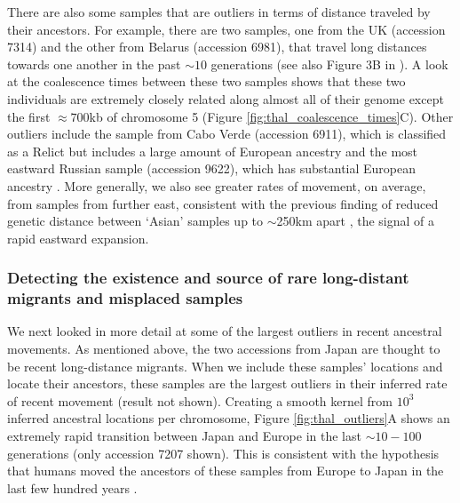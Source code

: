 \documentclass[12pt]{article}
\begin{document}

There are also some samples that are outliers in terms of distance traveled by their ancestors.
For example, there are two samples, one from the UK (accession 7314) and the other from Belarus (accession 6981), that travel long distances towards one another in the past $\sim10$ generations (see also Figure 3B in \citep{alonso2016}). 
A look at the coalescence times between these two samples shows that these two individuals are extremely closely related along almost all of their genome except the first $\approx700$kb of chromosome 5 (Figure \ref{fig:thal_coalescence_times}C).
Other outliers include the sample from Cabo Verde (accession 6911), which is classified as a Relict but includes a large amount of European ancestry \citep{alonso2016} and the most eastward Russian sample (accession 9622), which has substantial European ancestry \citep{alonso2016}.
More generally, we also see greater rates of movement, on average, from samples from further east, consistent with the previous finding of reduced genetic distance between `Asian' samples up to $\sim$250km apart \citep{alonso2016}, the signal of a rapid eastward expansion. 

\subsubsection*{Detecting the existence and source of rare long-distant migrants and misplaced samples}

We next looked in more detail at some of the largest outliers in recent ancestral movements.
As mentioned above, the two accessions from Japan are thought to be recent long-distance migrants.
When we include these samples' locations and locate their ancestors, these samples are the largest outliers in their inferred rate of recent movement (result not shown).
Creating a smooth kernel from $10^3$ inferred ancestral locations per chromosome, Figure \ref{fig:thal_outliers}A shows an extremely rapid transition between Japan and Europe in the last $\sim10-100$ generations (only accession 7207 shown).
This is consistent with the hypothesis that humans moved the ancestors of these samples from Europe to Japan in the last few hundred years \citep{zou2017adaptation}. 

\end{document}
